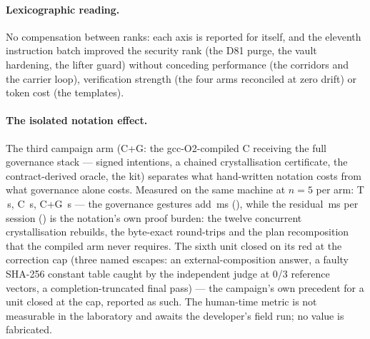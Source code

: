 \documentclass[11pt,a4paper]{article}
\begin{document}
\paragraph{Lexicographic reading.} No compensation between ranks: each
axis is reported for itself, and the eleventh instruction batch
improved the security rank (the D81 purge, the vault hardening, the
lifter guard) without conceding performance (the corridors and the
carrier loop), verification strength (the four arms reconciled at
zero drift) or token cost (the templates).

\paragraph{The isolated notation effect.} The third campaign arm
(C+G: the gcc-O2-compiled C receiving the full governance stack ---
signed intentions, a chained crystallisation certificate, the
contract-derived oracle, the kit) separates what hand-written
notation costs from what governance alone costs. Measured on the same
machine at $n{=}5$ per arm: T \cgMquatreT{}\,s, C \cgMquatreC{}\,s,
C+G \cgMquatreCG{}\,s --- the governance gestures add
\cgEffetGouvernanceMs{}\,ms (\cgEffetGouvernanceRatio{}), while the
residual \cgEffetNotationMs{}\,ms per session
(\cgEffetNotationRatio{}) is the notation's own proof burden: the
twelve concurrent crystallisation rebuilds, the byte-exact
round-trips and the plan recomposition that the compiled arm never
requires. The sixth unit closed on its red at the correction cap
(three named escapes: an external-composition answer, a faulty
SHA-256 constant table caught by the independent judge at 0/3
reference vectors, a completion-truncated final pass) --- the
campaign's own precedent for a unit closed at the cap, reported as
such. The human-time metric is not measurable in the laboratory and
awaits the developer's field run; no value is fabricated.
\end{document}
